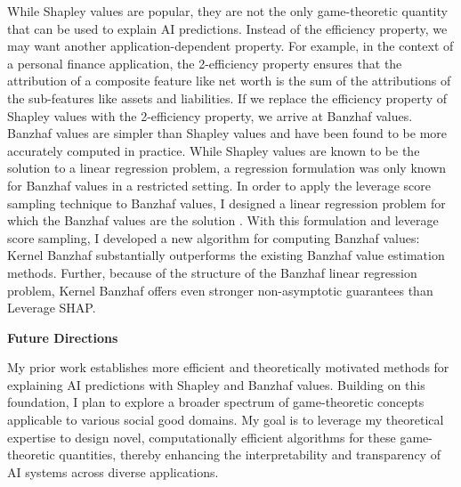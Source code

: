 \documentclass[11pt]{article}
\begin{document}
{While Shapley values are popular, they are not the only game-theoretic quantity that can be used to explain AI predictions.
Instead of the efficiency property, we may want another application-dependent property.
For example, in the context of a personal finance application, the 2-efficiency property ensures that the attribution of a composite feature like net worth is the sum of the attributions of the sub-features like assets and liabilities.
If we replace the efficiency property of Shapley values with the 2-efficiency property, we arrive at Banzhaf values.
Banzhaf values are simpler than Shapley values and have been found to be more accurately computed in practice.
While Shapley values are known to be the solution to a linear regression problem, a regression formulation was only known for Banzhaf values in a restricted setting.
In order to apply the leverage score sampling technique to Banzhaf values, I designed a linear regression problem for which the Banzhaf values are the solution \cite{liu2024kernel}.
With this formulation and leverage score sampling, I developed a new algorithm for computing Banzhaf values:
Kernel Banzhaf substantially outperforms the existing Banzhaf value estimation methods.
Further, because of the structure of the Banzhaf linear regression problem, Kernel Banzhaf offers even stronger non-asymptotic guarantees than Leverage SHAP.

{ \large \textbf{Future Directions}}

My prior work establishes more efficient and theoretically motivated methods for explaining AI predictions with Shapley and Banzhaf values.
Building on this foundation, I plan to explore a broader spectrum of game-theoretic concepts applicable to various social good domains. My goal is to leverage my theoretical expertise to design novel, computationally efficient algorithms for these game-theoretic quantities, thereby enhancing the interpretability and transparency of AI systems across diverse applications.

}
\end{document}
